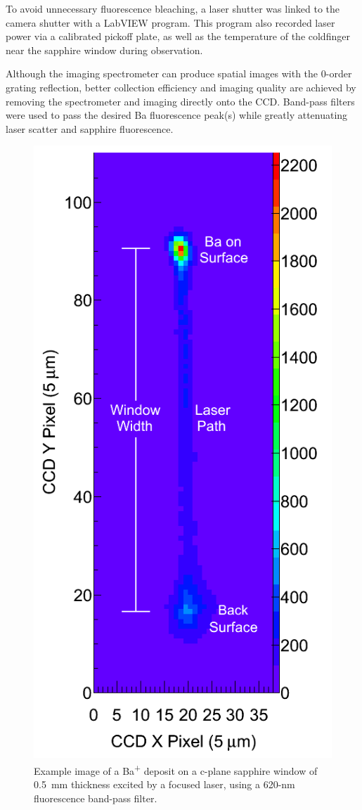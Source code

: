 
To avoid unnecessary fluorescence bleaching, a laser shutter was linked to the camera shutter with a LabVIEW program.  This program also recorded laser power via a calibrated pickoff plate, as well as the temperature of the coldfinger near the sapphire window during observation.


Although the imaging spectrometer can produce spatial images with the 0-order grating reflection, better collection efficiency and imaging quality are achieved by removing the spectrometer and imaging directly onto the CCD.  Band-pass filters were used to pass the desired Ba fluorescence peak(s) while greatly attenuating laser scatter and sapphire fluorescence.

\begin{figure} %
        \centering
                \includegraphics[width=.4\textwidth]{figures/imageExamp.png}
                \caption{Example image of a Ba\textsuperscript{+} deposit on a c-plane sapphire window of 0.5~mm thickness excited by a focused laser, using a 620-nm fluorescence band-pass filter.}
\label{fig:imageexamp}
\end{figure}

